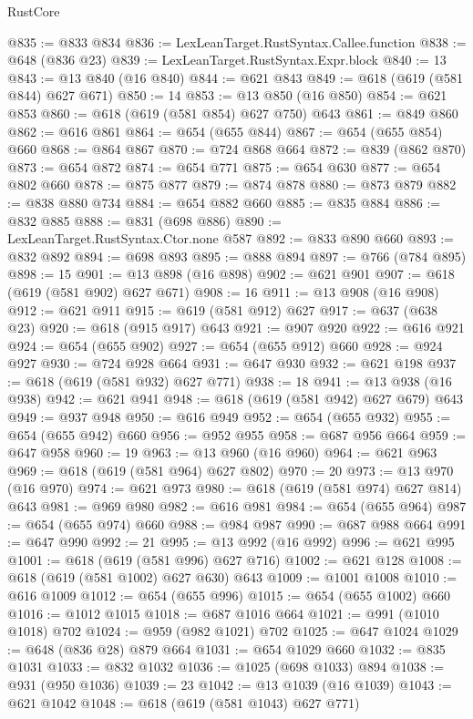 \begin{lexlean}{RustCore}
\begin{coremodule}
@835 := @833 @834
@836 := LexLeanTarget.RustSyntax.Callee.function
@838 := @648 (@836 @23)
@839 := LexLeanTarget.RustSyntax.Expr.block
@840 := 13
@843 := @13 @840 (@16 @840)
@844 := @621 @843
@849 := @618 (@619 (@581 @844) @627 @671)
@850 := 14
@853 := @13 @850 (@16 @850)
@854 := @621 @853
@860 := @618 (@619 (@581 @854) @627 @750) @643
@861 := @849 @860
@862 := @616 @861
@864 := @654 (@655 @844)
@867 := @654 (@655 @854) @660
@868 := @864 @867
@870 := @724 @868 @664
@872 := @839 (@862 @870)
@873 := @654 @872
@874 := @654 @771
@875 := @654 @630
@877 := @654 @802 @660
@878 := @875 @877
@879 := @874 @878
@880 := @873 @879
@882 := @838 @880 @734
@884 := @654 @882 @660
@885 := @835 @884
@886 := @832 @885
@888 := @831 (@698 @886)
@890 := LexLeanTarget.RustSyntax.Ctor.none @587
@892 := @833 @890 @660
@893 := @832 @892
@894 := @698 @893
@895 := @888 @894
@897 := @766 (@784 @895)
@898 := 15
@901 := @13 @898 (@16 @898)
@902 := @621 @901
@907 := @618 (@619 (@581 @902) @627 @671)
@908 := 16
@911 := @13 @908 (@16 @908)
@912 := @621 @911
@915 := @619 (@581 @912) @627
@917 := @637 (@638 @23)
@920 := @618 (@915 @917) @643
@921 := @907 @920
@922 := @616 @921
@924 := @654 (@655 @902)
@927 := @654 (@655 @912) @660
@928 := @924 @927
@930 := @724 @928 @664
@931 := @647 @930
@932 := @621 @198
@937 := @618 (@619 (@581 @932) @627 @771)
@938 := 18
@941 := @13 @938 (@16 @938)
@942 := @621 @941
@948 := @618 (@619 (@581 @942) @627 @679) @643
@949 := @937 @948
@950 := @616 @949
@952 := @654 (@655 @932)
@955 := @654 (@655 @942) @660
@956 := @952 @955
@958 := @687 @956 @664
@959 := @647 @958
@960 := 19
@963 := @13 @960 (@16 @960)
@964 := @621 @963
@969 := @618 (@619 (@581 @964) @627 @802)
@970 := 20
@973 := @13 @970 (@16 @970)
@974 := @621 @973
@980 := @618 (@619 (@581 @974) @627 @814) @643
@981 := @969 @980
@982 := @616 @981
@984 := @654 (@655 @964)
@987 := @654 (@655 @974) @660
@988 := @984 @987
@990 := @687 @988 @664
@991 := @647 @990
@992 := 21
@995 := @13 @992 (@16 @992)
@996 := @621 @995
@1001 := @618 (@619 (@581 @996) @627 @716)
@1002 := @621 @128
@1008 := @618 (@619 (@581 @1002) @627 @630) @643
@1009 := @1001 @1008
@1010 := @616 @1009
@1012 := @654 (@655 @996)
@1015 := @654 (@655 @1002) @660
@1016 := @1012 @1015
@1018 := @687 @1016 @664
@1021 := @991 (@1010 @1018) @702
@1024 := @959 (@982 @1021) @702
@1025 := @647 @1024
@1029 := @648 (@836 @28) @879 @664
@1031 := @654 @1029 @660
@1032 := @835 @1031
@1033 := @832 @1032
@1036 := @1025 (@698 @1033) @894
@1038 := @931 (@950 @1036)
@1039 := 23
@1042 := @13 @1039 (@16 @1039)
@1043 := @621 @1042
@1048 := @618 (@619 (@581 @1043) @627 @771)

\end{coremodule}
\end{lexlean}

